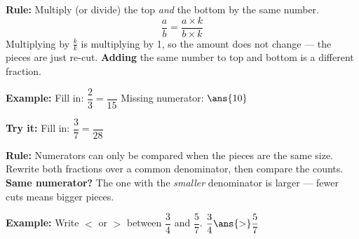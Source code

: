 \documentclass[12pt]{article}
\begin{document}


\begin{formulabox}
\textbf{Rule:} Multiply (or divide) the top \emph{and} the bottom by the same number.
\[ \frac{a}{b} = \frac{a \times k}{b \times k} \]
Multiplying by $\frac{k}{k}$ is multiplying by 1, so the amount does not change --- the pieces are just re-cut. \textbf{Adding} the same number to top and bottom is a different fraction.
\end{formulabox}

\begin{examplebox}
\textbf{Example:} \quad Fill in: $\dfrac{2}{3} = \dfrac{\ \ }{15}$
Missing numerator: $\ans{10}$
\end{examplebox}

\begin{tryitbox}
\textbf{Try it:} \quad Fill in: $\dfrac{3}{7} = \dfrac{\ \ }{28}$\\[2pt]
\end{tryitbox}


\begin{formulabox}
\textbf{Rule:} Numerators can only be compared when the pieces are the same size.\\[3pt]
Rewrite both fractions over a common denominator, then compare the counts.\\[3pt]
\textbf{Same numerator?} The one with the \emph{smaller} denominator is larger --- fewer cuts means bigger pieces.
\end{formulabox}

\begin{examplebox}
\textbf{Example:} \quad Write $<$ or $>$ between $\dfrac{3}{4}$ and $\dfrac{5}{7}$.
$\dfrac{3}{4} \ans{>} \dfrac{5}{7}$
\end{examplebox}
\end{document}
